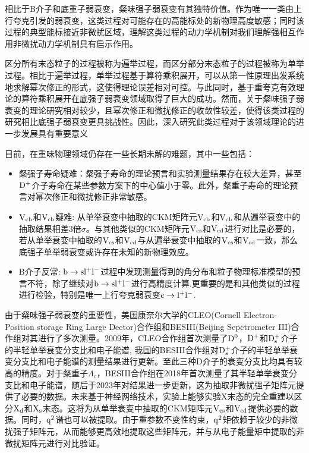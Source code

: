 相比于B介子和底重子弱衰变，粲味强子弱衰变有其独特价值。作为唯一一类由上行夸克引发的弱衰变，这类过程对可能存在的高能标处的新物理高度敏感；同时该过程的典型能标接近非微扰区域，理解这类过程的动力学机制对我们理解强相互作用非微扰动力学机制具有启示作用。

区分所有末态粒子的过程被称为遍举过程，而区分部分末态粒子的过程被称为单举过程。相比于遍举过程，单举过程基于算符乘积展开，可以从第一性原理出发系统地求解幂次修正的形式，这使得理论误差相对可控。与此同时，基于重夸克有效理论的算符乘积展开在底强子弱衰变领域取得了巨大的成功。然而，关于粲味强子弱衰变的理论研究相对较少，且幂次修正和微扰修正的收敛性较差，使得该类过程的研究相比底强子弱衰变更具挑战性。因此，深入研究此类过程对于该领域理论的进一步发展具有重要意义

目前，在重味物理领域仍存在一些长期未解的难题，其中一些包括：
\begin{itemize}
\item 粲强子寿命疑难：粲强子寿命的理论预言和实验测量结果存在较大差异，甚至$\mathrm{D}^{+}$介子寿命在某些参数方案下的中心值小于零。此外，粲重子寿命的理论预言对幂次修正和微扰修正非常敏感。
\item $\mathrm{V_{cb}}$和$\mathrm{V_{cb}}$疑难: 从单举衰变中抽取的CKM矩阵元$\mathrm{V_{cb}}$和$\mathrm{V_{cb}}$和从遍举衰变中的抽取结果相差3倍$\sigma$。与其他类似的CKM矩阵元$\mathrm{V_{cs}}$和$\mathrm{V_{cd}}$进行对比是必要的，若从单举衰变中抽取的$\mathrm{V_{cs}}$和$\mathrm{V_{cd}}$与从遍举衰变中抽取的$\mathrm{V_{cs}}$和$\mathrm{V_{cd}}$一致，那么底强子单举弱衰变或许存在未知的新物理效应。
\item B介子反常: $\mathrm{b\to s l^{+}l^{-}}$过程中发现测量得到的角分布和粒子物理标准模型的预言不符，除了继续对$\mathrm{b\to s l^{+}l^{-}}$进行高精度计算.更重要的是和其他类似的过程进行检验，特别是唯一上行夸克弱衰变$\mathrm{c\to l^{+}l^{-}}$.
\end{itemize}


由于粲味强子弱衰变的重要性，美国康奈尔大学的CLEO(Cornell Electron-Position storage Ring Large Dector)合作组和BESIII(Beijing Sepctrometer III)合作组对其进行了多次测量。2009年，CLEO合作组首次测量了$\mathrm{D}^{0}$，$\mathrm{D}^{+}$和$\mathrm{D}_{\mathrm{s}}^+$介子的半轻单举衰变分支比和电子能谱, 我国的BESIII合作组对$\mathrm{D}^+_s$介子的半轻单举衰变分支比和电子能谱的测量结果进行更新。至此三种D介子的衰变分支比均具有较高的精度。对于粲重子$\Lambda_{c}$，BESIII合作组在2018年首次测量了其半轻单举衰变分支比和电子能谱，随后于2023年对结果进一步更新，这为抽取非微扰强子矩阵元提供了必要的数据。未来基于神经网络技术，实验上能够实验X末态的完全重建以区分$\mathrm{X}_{\mathrm{d}}$和$\mathrm{X}_{\mathrm{s}}$末态。这将为从单举衰变中抽取的CKM矩阵元$\mathrm{V}_{\mathrm{cs}}$和$\mathrm{V}_{\mathrm{cd}}$提供必要的数据。同时，$\mathrm{q}^{2}$谱也可以被提取。由于重参数不变性约束，$\mathrm{q}^{2}$矩依赖于较少的非微扰强子矩阵元，从而能够更高效地提取这些矩阵元，并与从电子能量矩中提取的非微扰矩阵元进行对比验证。


